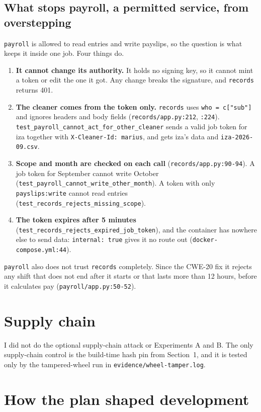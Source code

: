 \documentclass[11pt,a4paper]{article}
\newcommand{\file}[1]{\nolinkurl{#1}}
\newcommand{\test}[1]{\nolinkurl{#1}}
\begin{document}
\subsection*{What stops payroll, a permitted service, from overstepping}

\texttt{payroll} is allowed to read entries and write payslips, so the question is what keeps it inside one job. Four things do.

\begin{enumerate}
  \item \textbf{It cannot change its authority.} It holds no signing key, so it cannot mint a token or edit the one it got. Any change breaks the signature, and \texttt{records} returns 401.
  \item \textbf{The cleaner comes from the token only.} \texttt{records} uses \texttt{who = c["sub"]} and ignores headers and body fields (\file{records/app.py:212}, \file{:224}). \test{test_payroll_cannot_act_for_other_cleaner} sends a valid job token for iza together with \texttt{X-Cleaner-Id: marius}, and gets iza's data and \file{iza-2026-09.csv}.
  \item \textbf{Scope and month are checked on each call} (\file{records/app.py:90-94}). A job token for September cannot write October (\test{test_payroll_cannot_write_other_month}). A token with only \texttt{payslips:write} cannot read entries (\test{test_records_rejects_missing_scope}).
  \item \textbf{The token expires after 5 minutes} (\test{test_records_rejects_expired_job_token}), and the container has nowhere else to send data: \texttt{internal: true} gives it no route out (\file{docker-compose.yml:44}).
\end{enumerate}

\texttt{payroll} also does not trust \texttt{records} completely. Since the CWE-20 fix it rejects any shift that does not end after it starts or that lasts more than 12 hours, before it calculates pay (\file{payroll/app.py:50-52}).

\section{Supply chain}

I did not do the optional supply-chain attack or Experiments A and B. The only supply-chain control is the build-time hash pin from Section~1, and it is tested only by the tampered-wheel run in \file{evidence/wheel-tamper.log}.

\section{How the plan shaped development}
\end{document}
